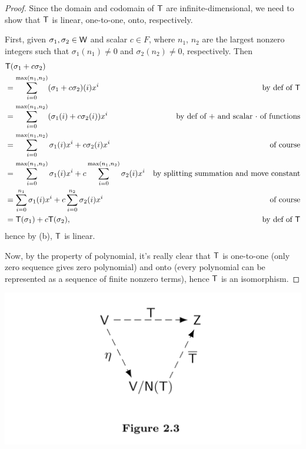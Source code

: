 \begin{proof}
Since the domain and codomain of \(\textsf{T}\) are infinite-dimensional, we need to show that \(\textsf{T}\) is linear, one-to-one, onto, respectively.

First, given \(\sigma_1, \sigma_2 \in \textsf{W}\) and scalar \(c \in F\), where \(n_1\), \(n_2\) are the largest nonzero integers such that \(\sigma_1(n_1) \ne 0\) and \(\sigma_2(n_2) \ne 0\), respectively.
Then
\begin{align*}
    & \textsf{T}(\sigma_1 + c \sigma_2) \\
    & = \sum_{i = 0}^{\max(n_1, n_2)} (\sigma_1 + c \sigma_2)(i) x^i & \text{by def of \(\textsf{T}\)} \\
    & = \sum_{i = 0}^{\max(n_1, n_2)} (\sigma_1(i) + c \sigma_2(i)) x^i & \text{by def of \(+\) and scalar \(\cdot\) of functions} \\
    & = \sum_{i = 0}^{\max(n_1, n_2)} \sigma_1(i) x^i + c \sigma_2(i) x^i & \text{of course} \\
    & = \sum_{i = 0}^{\max(n_1, n_2)} \sigma_1(i) x^i + c \sum_{i = 0}^{\max(n_1, n_2)} \sigma_2(i) x^i & \text{by splitting summation and move constant} \\
    & = \sum_{i = 0}^{n_1} \sigma_1(i) x^i + c \sum_{i = 0}^{n_2} \sigma_2(i) x^i & \text{of course} \\
    & = \textsf{T}(\sigma_1) + c\textsf{T}(\sigma_2), & \text{by def of \(\textsf{T}\)}
\end{align*}
hence by (b), \(\textsf{T}\) is linear.

Now, by the property of polynomial, it's really clear that \(\textsf{T}\) is one-to-one (only zero sequence gives zero polynomial) and onto (every polynomial can be represented as a sequence of finite nonzero terms), hence \(\textsf{T}\) is an isomorphism.
\end{proof}

\includegraphics[width=16cm]{images/figure-2-3.png}

